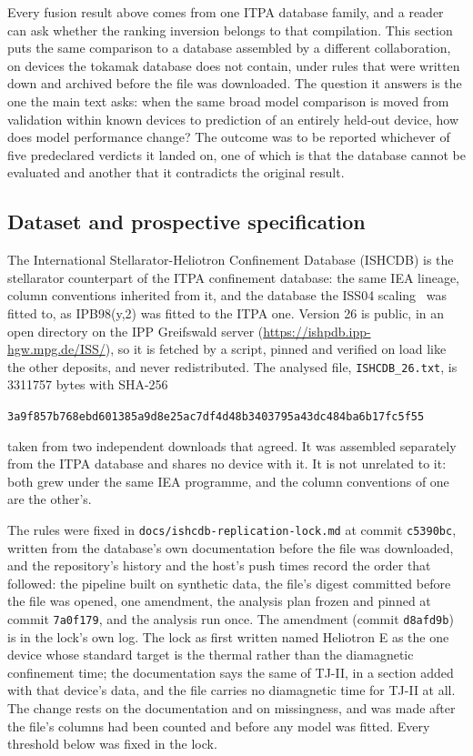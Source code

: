 \documentclass[12pt,letterpaper]{article}
\begin{document}
Every fusion result above comes from one ITPA database family, and a reader can
ask whether the ranking inversion belongs to that compilation. This section
puts the same comparison to a database assembled by a different collaboration,
on devices the tokamak database does not contain, under rules that were written
down and archived before the file was downloaded. The question it answers is
the one the main text asks: when the same broad model comparison is moved from
validation within known devices to prediction of an entirely held-out device,
how does model performance change? The outcome was to be reported whichever of
five predeclared verdicts it landed on, one of which is that the database
cannot be evaluated and another that it contradicts the original result.

\subsection{Dataset and prospective specification}

The International Stellarator-Heliotron Confinement Database (ISHCDB) is the
stellarator counterpart of the ITPA confinement database: the same IEA lineage,
column conventions inherited from it, and the database the ISS04
scaling~\cite{iss04} was fitted to, as IPB98(y,2) was fitted to the ITPA one.
Version 26 is public, in an open directory on the IPP
Greifswald server (\url{https://ishpdb.ipp-hgw.mpg.de/ISS/}), so it is fetched by
a script, pinned and verified on load like the other deposits, and never
redistributed. The analysed file, \texttt{ISHCDB\_26.txt}, is
3311757 bytes with SHA-256
\begin{center}\scriptsize\texttt{3a9f857b768ebd601385a9d8e25ac7df4d48b3403795a43dc484ba6b17fc5f55}\end{center}
\noindent taken from two independent downloads that agreed. It was assembled
separately from the ITPA database and shares no device with it. It is not
unrelated to it: both grew under the same IEA programme, and the column
conventions of one are the other's.

The rules were fixed in \texttt{docs/ishcdb-replication-lock.md} at commit
\texttt{c5390bc}, written from the database's own documentation before the
file was downloaded, and the repository's history and the host's push times
record the order that followed: the pipeline built on synthetic data, the file's
digest committed before the file was opened, one amendment, the analysis plan
frozen and pinned at commit \texttt{7a0f179}, and the analysis run once. The
amendment (commit \texttt{d8afd9b}) is in the lock's own log. The lock as
first written named Heliotron E as the one device whose standard target is the
thermal rather than the diamagnetic confinement time; the documentation says the
same of TJ-II, in a section added with that device's data, and the file carries
no diamagnetic time for TJ-II at all. The change rests on the documentation and
on missingness, and was made after the file's columns had been counted and
before any model was fitted. Every threshold below was fixed in the lock.
\end{document}

